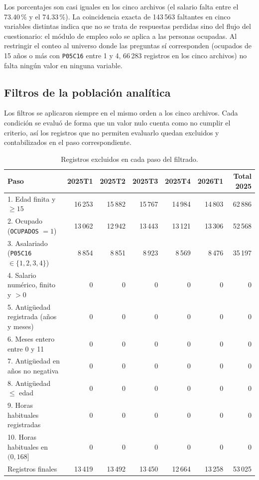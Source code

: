 \documentclass[11pt,a4paper]{article}
\newcommand{\var}[1]{\texttt{#1}}
\begin{document}
Los porcentajes son casi iguales en los cinco archivos (el salario falta entre el 73.40\,\% y el 74.33\,\%). La coincidencia exacta de 143\,563 faltantes en cinco variables distintas indica que no se trata de respuestas perdidas sino del flujo del cuestionario: el módulo de empleo solo se aplica a las personas ocupadas. Al restringir el conteo al universo donde las preguntas sí corresponden (ocupados de 15 años o más con \var{P05C16} entre 1 y 4, 66\,283 registros en los cinco archivos) no falta ningún valor en ninguna variable.

\subsection{Filtros de la población analítica}

Los filtros se aplicaron siempre en el mismo orden a los cinco archivos. Cada condición se evaluó de forma que un valor nulo cuenta como no cumplir el criterio, así los registros que no permiten evaluarlo quedan excluidos y contabilizados en el paso correspondiente.

\begin{table}[H]
\centering
\caption{Registros excluidos en cada paso del filtrado.}
\label{tab:filtros}
\footnotesize\setlength{\tabcolsep}{4pt}
\begin{tabular}{lrrrrrr}
\toprule
Paso & 2025T1 & 2025T2 & 2025T3 & 2025T4 & 2026T1 & Total 2025 \\
\midrule
1. Edad finita y $\geq 15$ & 16\,253 & 15\,882 & 15\,767 & 14\,984 & 14\,803 & 62\,886 \\
2. Ocupado (\var{OCUPADOS} $= 1$) & 13\,062 & 12\,942 & 13\,443 & 13\,121 & 13\,306 & 52\,568 \\
3. Asalariado (\var{P05C16} $\in \{1,2,3,4\}$) & 8\,854 & 8\,851 & 8\,923 & 8\,569 & 8\,476 & 35\,197 \\
4. Salario numérico, finito y $> 0$ & 0 & 0 & 0 & 0 & 0 & 0 \\
5. Antigüedad registrada (años y meses) & 0 & 0 & 0 & 0 & 0 & 0 \\
6. Meses entero entre 0 y 11 & 0 & 0 & 0 & 0 & 0 & 0 \\
7. Antigüedad en años no negativa & 0 & 0 & 0 & 0 & 0 & 0 \\
8. Antigüedad $\leq$ edad & 0 & 0 & 0 & 0 & 0 & 0 \\
9. Horas habituales registradas & 0 & 0 & 0 & 0 & 0 & 0 \\
10. Horas habituales en $(0, 168]$ & 0 & 0 & 0 & 0 & 0 & 0 \\
\midrule
Registros finales & 13\,419 & 13\,492 & 13\,450 & 12\,664 & 13\,258 & 53\,025 \\
\bottomrule
\end{tabular}
\end{table}
\end{document}
